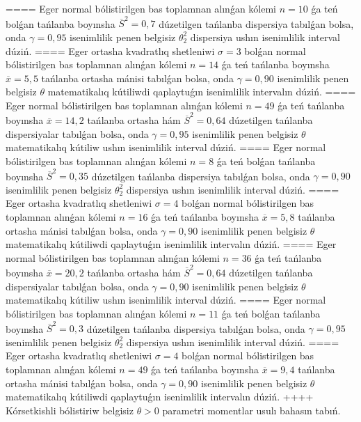 ====
Eger normal bólistirilgen bas toplamnan alınǵan kólemi \(n = 10\) ǵa teń bolǵan tańlanba boyınsha \({\overline{S}}^{2} = 0,7\) dúzetilgen tańlanba dispersiya tabılǵan bolsa, onda \(\gamma = 0,95\) isenimlilik penen belgisiz \(\theta_{2}^{2}\) dispersiya ushın isenimlilik interval dúziń.
====
Eger ortasha kvadratlıq shetleniwi \(\sigma = 3\) bolǵan normal bólistirilgen bas toplamnan alınǵan kólemi \(n = 14\) ǵa teń tańlanba boyınsha \(\overline{x} = 5,5\) tańlanba ortasha mánisi tabılǵan bolsa, onda \(\gamma = 0,90\) isenimlilik penen belgisiz \(\theta\) matematikalıq kútiliwdi qaplaytuǵın isenimlilik intervalın dúziń.
====
Eger normal bólistirilgen bas toplamnan alınǵan kólemi \(n = 49\) ǵa teń tańlanba boyınsha \(\overline{x} = 14,2\) tańlanba ortasha hám \({\overline{S}}^{2} = 0,64\) dúzetilgen tańlanba dispersiyalar tabılǵan bolsa, onda \(\gamma = 0,95\) isenimlilik penen belgisiz \(\theta\) matematikalıq kútiliw ushın isenimlilik interval dúziń.
====
Eger normal bólistirilgen bas toplamnan alınǵan kólemi \(n = 8\) ǵa teń bolǵan tańlanba boyınsha \({\overline{S}}^{2} = 0,35\) dúzetilgen tańlanba dispersiya tabılǵan bolsa, onda \(\gamma = 0,90\) isenimlilik penen belgisiz \(\theta_{2}^{2}\) dispersiya ushın isenimlilik interval dúziń.
====
Eger ortasha kvadratlıq shetleniwi \(\sigma = 4\) bolǵan normal bólistirilgen bas toplamnan alınǵan kólemi \(n = 16\) ǵa teń tańlanba boyınsha \(\overline{x} = 5,8\) tańlanba ortasha mánisi tabılǵan bolsa, onda \(\gamma = 0,90\) isenimlilik penen belgisiz \(\theta\) matematikalıq kútiliwdi qaplaytuǵın isenimlilik intervalın dúziń.
====
Eger normal bólistirilgen bas toplamnan alınǵan kólemi \(n = 36\) ǵa teń tańlanba boyınsha \(\overline{x} = 20,2\) tańlanba ortasha hám \({\overline{S}}^{2} = 0,64\) dúzetilgen tańlanba dispersiyalar tabılǵan bolsa, onda \(\gamma = 0,90\) isenimlilik penen belgisiz \(\theta\) matematikalıq kútiliw ushın isenimlilik interval dúziń.
====
Eger normal bólistirilgen bas toplamnan alınǵan kólemi \(n = 11\) ǵa teń bolǵan tańlanba boyınsha \({\overline{S}}^{2} = 0,3\) dúzetilgen tańlanba dispersiya tabılǵan bolsa, onda \(\gamma = 0,95\) isenimlilik penen belgisiz \(\theta_{2}^{2}\) dispersiya ushın isenimlilik interval dúziń.
====
Eger ortasha kvadratlıq shetleniwi \(\sigma = 4\) bolǵan normal bólistirilgen bas toplamnan alınǵan kólemi \(n = 49\) ǵa teń tańlanba boyınsha \(\overline{x} = 9,4\) tańlanba ortasha mánisi tabılǵan bolsa, onda \(\gamma = 0,90\) isenimlilik penen belgisiz \(\theta\) matematikalıq kútiliwdi qaplaytuǵın isenimlilik intervalın dúziń.
++++
Kórsetkishli bólistiriw belgisiz \(\theta > 0\) parametri momentlar usulı bahasın tabıń.
